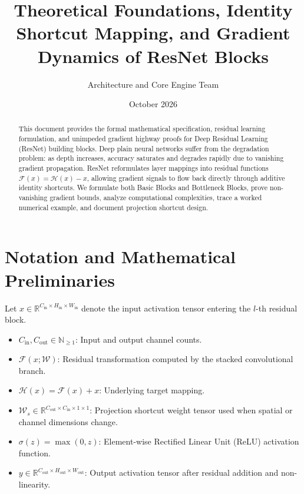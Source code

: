 \documentclass[11pt,a4paper]{article}
\title{\textbf{Theoretical Foundations, Identity Shortcut Mapping, and Gradient Dynamics of ResNet Blocks}}
\author{Architecture and Core Engine Team}
\date{October 2026}
\theoremstyle{definition}
\begin{document}
\maketitle

\begin{abstract}
This document provides the formal mathematical specification, residual learning formulation, and unimpeded gradient highway proofs for Deep Residual Learning (ResNet) building blocks. Deep plain neural networks suffer from the degradation problem: as depth increases, accuracy saturates and degrades rapidly due to vanishing gradient propagation. ResNet reformulates layer mappings into residual functions $\mathcal{F}(x) = \mathcal{H}(x) - x$, allowing gradient signals to flow back directly through additive identity shortcuts. We formulate both Basic Blocks and Bottleneck Blocks, prove non-vanishing gradient bounds, analyze computational complexities, trace a worked numerical example, and document projection shortcut design.
\end{abstract}

\section{Notation and Mathematical Preliminaries}

Let $x \in \mathbb{R}^{C_{\text{in}} \times H_{\text{in}} \times W_{\text{in}}}$ denote the input activation tensor entering the $l$-th residual block.

\begin{itemize}
    \item $C_{\text{in}}, C_{\text{out}} \in \mathbb{N}_{\ge 1}$: Input and output channel counts.
    \item $\mathcal{F}(x; \mathcal{W})$: Residual transformation computed by the stacked convolutional branch.
    \item $\mathcal{H}(x) = \mathcal{F}(x) + x$: Underlying target mapping.
    \item $\mathcal{W}_s \in \mathbb{R}^{C_{\text{out}} \times C_{\text{in}} \times 1 \times 1}$: Projection shortcut weight tensor used when spatial or channel dimensions change.
    \item $\sigma(z) = \max(0, z)$: Element-wise Rectified Linear Unit (ReLU) activation function.
    \item $y \in \mathbb{R}^{C_{\text{out}} \times H_{\text{out}} \times W_{\text{out}}}$: Output activation tensor after residual addition and non-linearity.
\end{itemize}
\end{document}
